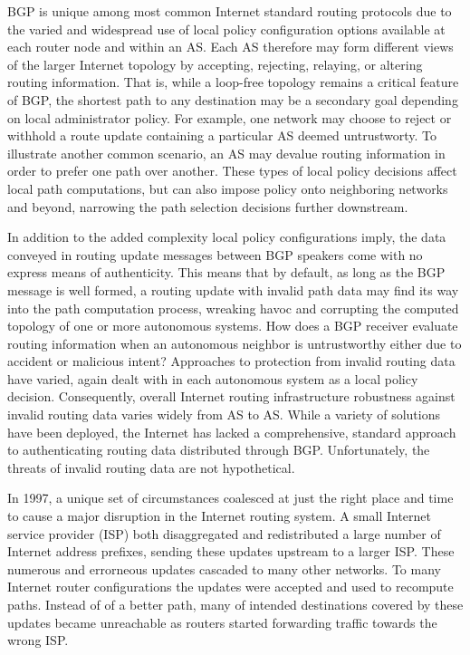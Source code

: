 \documentclass[sigconf]{acmart}
\begin{document}
BGP is unique among most common Internet standard routing protocols due
to the varied and widespread use of local policy configuration options
available at each router node and within an AS.  Each AS therefore may
form different views of the larger Internet topology by accepting,
rejecting, relaying, or altering routing information.  That is, while a
loop-free topology remains a critical feature of BGP, the shortest path
to any destination may be a secondary goal depending on local
administrator policy.  For example, one network may choose to reject or
withhold a route update containing a particular AS deemed untrustworty.
To illustrate another common scenario, an AS may devalue routing
information in order to prefer one path over another.  These types of
local policy decisions affect local path computations, but can also
impose policy onto neighboring networks and beyond, narrowing the path
selection decisions further downstream.

In addition to the added complexity local policy configurations imply,
the data conveyed in routing update messages between BGP speakers come
with no express means of authenticity.  This means that by default, as
long as the BGP message is well formed, a routing update with invalid
path data may find its way into the path computation process, wreaking
havoc and corrupting the computed topology of one or more autonomous
systems.  How does a BGP receiver evaluate routing information when an
autonomous neighbor is untrustworthy either due to accident or malicious
intent?  Approaches to protection from invalid routing data have varied,
again dealt with in each autonomous system as a local policy decision.
Consequently, overall Internet routing infrastructure robustness against
invalid routing data varies widely from AS to AS.  While a variety of
solutions have been deployed, the Internet has lacked a comprehensive,
standard approach to authenticating routing data distributed through
BGP.  Unfortunately, the threats of invalid routing data are not
hypothetical.

In 1997, a unique set of circumstances coalesced at just the right place
and time to cause a major disruption in the Internet routing
system.\cite{barret_routing_1997}  A small Internet service provider
(ISP) both disaggregated and redistributed a large number of Internet
address prefixes, sending these updates upstream to a larger ISP.  These
numerous and errorneous updates cascaded to many other networks.  To
many Internet router configurations the updates were accepted and used
to recompute paths.  Instead of of a better path, many of intended
destinations covered by these updates became unreachable as routers
started forwarding traffic towards the wrong ISP.
\end{document}
